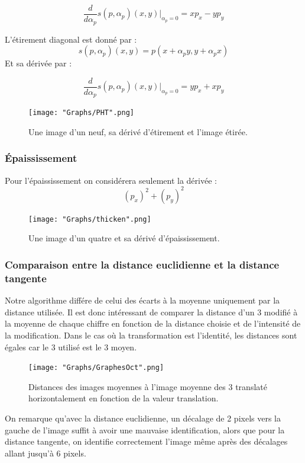 \documentclass[a4paper,11pt,twoside]{report}
\begin{document}
$$\frac{d}{d\alpha_p}s(p,\alpha_p)(x,y)|_{\alpha_p=0}=xp_x-yp_y$$ 

L'étirement diagonal est donné par : $$s(p,\alpha_p)(x,y) = p(x+\alpha_py,y+\alpha_px)$$  
Et sa dérivée par :

$$\frac{d}{d\alpha_p}s(p,\alpha_p)(x,y)|_{\alpha_p=0}=yp_x+xp_y$$ 

\begin{figure}[H]
  	\texttt{[image: "Graphs/PHT".png]}
  	\caption{Une image d'un neuf, sa dérivé d'étirement et l'image étirée.}
\end{figure}

\subsubsection{Épaississement}
Pour l'épaississement on considérera seulement la dérivée \cite[p.~127]{Elden} : $$(p_x)^2+(p_y)^2$$


\begin{figure}[H]
\begin{center}


  	\texttt{[image: "Graphs/thicken".png]}
  	\caption{Une image d'un quatre et sa dérivé d'épaississement.}
  	\end{center}
\end{figure}


\subsubsection{Comparaison entre la distance euclidienne et la distance tangente}
Notre algorithme différe de celui des écarts à la moyenne uniquement par la distance utilisée. Il est donc intéressant de comparer la distance d'un 3 modifié à la moyenne de chaque chiffre en fonction de la distance choisie et de l'intensité de la modification. Dans le cas où la transformation est l'identité, les distances sont égales car le 3 utilisé est le 3 moyen.

\begin{figure}[H]
  	\texttt{[image: "Graphs/GraphesOct".png]}
  	\caption{Distances des images moyennes à l'image moyenne des 3 translaté horizontalement en fonction de la valeur translation.}
\end{figure}

On remarque qu'avec la distance euclidienne, un décalage de 2 pixels vers la gauche de l'image suffit à avoir une mauvaise identification, alors que pour la distance tangente, on identifie correctement l'image même après des décalages allant jusqu'à 6 pixels.
\end{document}
